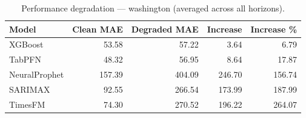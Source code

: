 \begin{table}[h]
\centering
\caption{Performance degradation — washington (averaged across all horizons).}
\label{tab:degradation_summary_washington}
\begin{tabular}{lrrrr}
\toprule
Model & Clean MAE & Degraded MAE & Increase & Increase \% \\
\midrule
XGBoost & 53.58 & 57.22 & 3.64 & 6.79 \\
TabPFN & 48.32 & 56.95 & 8.64 & 17.87 \\
NeuralProphet & 157.39 & 404.09 & 246.70 & 156.74 \\
SARIMAX & 92.55 & 266.54 & 173.99 & 187.99 \\
TimesFM & 74.30 & 270.52 & 196.22 & 264.07 \\
\bottomrule
\end{tabular}
\end{table}
